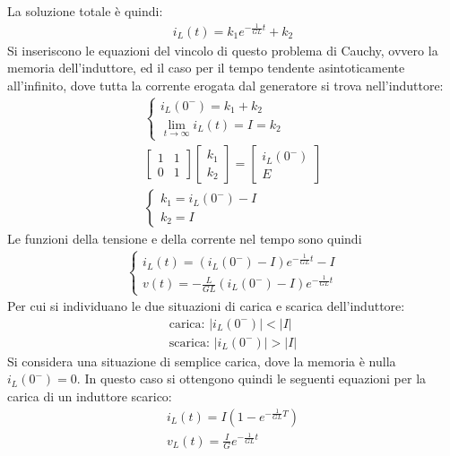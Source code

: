 \documentclass{article}
\numberwithin{equation}{subsection}
\begin{document}
La soluzione totale è quindi:
\begin{gather*}
    i_L(t)=k_1e^{-\frac{1}{GL}t}+k_2
\end{gather*}
Si inseriscono le equazioni del vincolo di questo problema di Cauchy, ovvero la memoria dell'induttore, ed il caso per il tempo tendente asintoticamente all'infinito, dove 
tutta la corrente erogata dal generatore si trova nell'induttore:
\begin{gather*}
    \begin{cases}
        i_L(0^-)=k_1+k_2\\
        \displaystyle\lim_{t\to\infty}i_L(t)=I=k_2
    \end{cases}\\
    \begin{bmatrix}
        1&1\\0&1
    \end{bmatrix}\begin{bmatrix}
        k_1\\k_2
    \end{bmatrix}=\begin{bmatrix}
        i_L(0^-)\\E
    \end{bmatrix}\\
    \begin{cases}
        k_1=i_L(0^-)-I\\
        k_2=I
    \end{cases}
\end{gather*}
Le funzioni della tensione e della corrente nel tempo sono quindi
\begin{gather*}
    \begin{cases}
        i_L(t)=(i_L(0^-)-I)e^{-\frac{1}{GL}t}-I\\
        v(t)=\displaystyle-\frac{L}{GL}(i_L(0^-)-I)e^{-\frac{1}{GL}t}
    \end{cases}
\end{gather*}
Per cui si individuano le due situazioni di carica e scarica dell'induttore:
\begin{gather*}
    \mbox{carica: }|i_L(0^-)|<|I|\\
    \mbox{scarica: }|i_L(0^-)|>|I|
\end{gather*}
Si considera una situazione di semplice carica, dove la memoria è nulla $i_L(0^-)=0$.
In questo caso si ottengono quindi le seguenti equazioni per la carica di un induttore scarico:
\begin{gather*}
    i_L(t)=I\left(1-e^{-\frac{1}{GL}T}\right)\\
    v_L(t)=\displaystyle\frac{I}{G}e^{-\frac{1}{GL}t}
\end{gather*}
\end{document}
